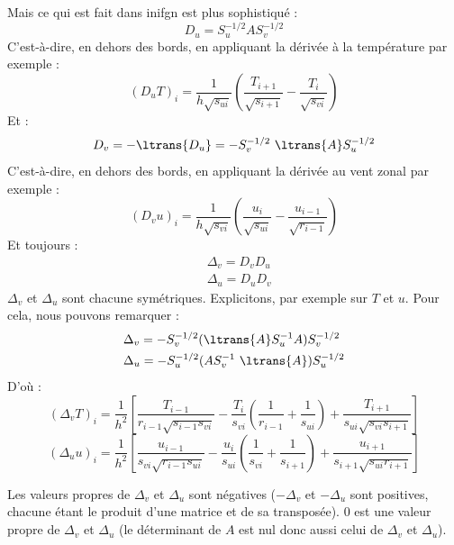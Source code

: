 \documentclass[a4paper,english,french]{article}
\begin{document}
Mais ce qui est fait dans inifgn est plus sophistiqué :
\begin{equation*}
  D_u = S_u^{- 1 / 2} A S_v^{- 1 / 2}
\end{equation*}
C'est-à-dire, en dehors des bords, en appliquant la dérivée à la
température par exemple :
\begin{equation*}
  (D_u T)_i
  = \frac{1}{h \sqrt{s_{ui}}}
  \left(\frac{T_{i + 1}}{\sqrt{s_{i + 1}}} - \frac{T_i}{\sqrt{s_{vi}}} \right)
\end{equation*}
Et :
\begin{equation*}
  D_v = - \ltrans{D_u} = - S_v^{- 1 / 2}\ \ltrans{A} S_u^{- 1 / 2}
\end{equation*}
C'est-à-dire, en dehors des bords, en appliquant la dérivée au vent
zonal par exemple :
\begin{equation*}
  (D_v u)_i
  = \frac{1}{h \sqrt{s_{vi}}}
  \left(\frac{u_i}{\sqrt{s_{ui}}} - \frac{u_{i - 1}}{\sqrt{r_{i - 1}}} \right)
\end{equation*}
Et toujours :
\begin{align*}
  & \Delta_v = D_v D_u \\
  & \Delta_u = D_u D_v
\end{align*}
$\Delta_v$ et $\Delta_u$ sont chacune symétriques. Explicitons, par
exemple sur $T$ et $u$. Pour cela, nous pouvons remarquer :
\begin{align*}
  & \Delta_v = - S_v^{- 1 / 2} (\ltrans{A} S_u^{- 1} A)  S_v^{- 1 / 2} \\
  & \Delta_u = - S_u^{- 1 / 2} (A S_v^{- 1}\ \ltrans{A}) S_u^{- 1 / 2}
\end{align*}
D'où :
\begin{equation*}
  (\Delta_v T)_i
  =
  \frac{1}{h^2}
  \left[
    \frac{T_{i - 1}}{r_{i - 1} \sqrt{s_{i - 1} s_{vi}}}
    - \frac{T_i}{s_{vi}} \left(\frac{1}{r_{i - 1}} + \frac{1}{s_{ui}} \right)
    + \frac{T_{i + 1}}{s_{ui} \sqrt{s_{vi} s_{i + 1}}}
  \right]
\end{equation*}
\begin{equation*}
  (\Delta_u u)_i
  =
  \frac{1}{h^2}
  \left[
    \frac{u_{i - 1}}{s_{vi} \sqrt{r_{i - 1} s_{ui}}}
    - \frac{u_i}{s_{ui}} \left(\frac{1}{s_{vi}} + \frac{1}{s_{i + 1}} \right)
    + \frac{u_{i + 1}}{s_{i + 1} \sqrt{s_{ui} r_{i + 1}}}
  \right]
\end{equation*}

Les valeurs propres de $\Delta_v$ et $\Delta_u$ sont négatives ($-
\Delta_v$ et $- \Delta_u$ sont positives, chacune étant le produit
d'une matrice et de sa transposée). 0 est une valeur propre de
$\Delta_v$ et $\Delta_u$ (le déterminant de $A$ est nul donc aussi
celui de $\Delta_v$ et $\Delta_u$).
\end{document}
